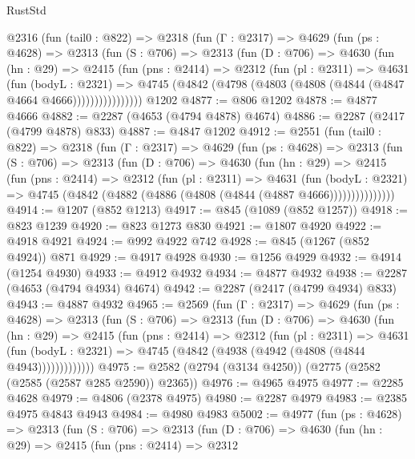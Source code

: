\begin{lexlean}{RustStd}
\begin{coremodule}
    @2316
      (fun (tail0 : @822) =>
      @2318
        (fun (Γ : @2317) =>
        @4629
          (fun (ps : @4628) =>
          @2313
            (fun (S : @706) =>
            @2313
              (fun (D : @706) =>
              @4630
                (fun (hn : @29) =>
                @2415
                  (fun (pns : @2414) =>
                  @2312
                    (fun (pl : @2311) =>
                    @4631
                      (fun (bodyL : @2321) =>
                      @4745 (@4842 (@4798 (@4803 (@4808 (@4844 (@4847 @4664 @4666))))))))))))))))
    @1202
@4877 := @806 @1202
@4878 := @4877 @4666
@4882 := @2287 (@4653 (@4794 @4878) @4674)
@4886 := @2287 (@2417 (@4799 @4878) @833)
@4887 := @4847 @1202
@4912 := @2551
    (fun (tail0 : @822) =>
    @2318
      (fun (Γ : @2317) =>
      @4629
        (fun (ps : @4628) =>
        @2313
          (fun (S : @706) =>
          @2313
            (fun (D : @706) =>
            @4630
              (fun (hn : @29) =>
              @2415
                (fun (pns : @2414) =>
                @2312
                  (fun (pl : @2311) =>
                  @4631
                    (fun (bodyL : @2321) =>
                    @4745 (@4842 (@4882 (@4886 (@4808 (@4844 (@4887 @4666)))))))))))))))
@4914 := @1207 (@852 @1213)
@4917 := @845 (@1089 (@852 @1257))
@4918 := @823 @1239
@4920 := @823 @1273 @830
@4921 := @1807 @4920
@4922 := @4918 @4921
@4924 := @992 @4922 @742
@4928 := @845 (@1267 (@852 @4924)) @871
@4929 := @4917 @4928
@4930 := @1256 @4929
@4932 := @4914 (@1254 @4930)
@4933 := @4912 @4932
@4934 := @4877 @4932
@4938 := @2287 (@4653 (@4794 @4934) @4674)
@4942 := @2287 (@2417 (@4799 @4934) @833)
@4943 := @4887 @4932
@4965 := @2569
    (fun (Γ : @2317) =>
    @4629
      (fun (ps : @4628) =>
      @2313
        (fun (S : @706) =>
        @2313
          (fun (D : @706) =>
          @4630
            (fun (hn : @29) =>
            @2415
              (fun (pns : @2414) =>
              @2312
                (fun (pl : @2311) =>
                @4631
                  (fun (bodyL : @2321) =>
                  @4745 (@4842 (@4938 (@4942 (@4808 (@4844 @4943)))))))))))))
@4975 := @2582 (@2794 (@3134 @4250)) (@2775 (@2582 (@2585 (@2587 @285 @2590)) @2365))
@4976 := @4965 @4975
@4977 := @2285 @4628
@4979 := @4806 (@2378 @4975)
@4980 := @2287 @4979
@4983 := @2385 @4975 @4843 @4943
@4984 := @4980 @4983
@5002 := @4977
    (fun (ps : @4628) =>
    @2313
      (fun (S : @706) =>
      @2313
        (fun (D : @706) =>
        @4630
          (fun (hn : @29) =>
          @2415
            (fun (pns : @2414) =>
            @2312

\end{coremodule}
\end{lexlean}
